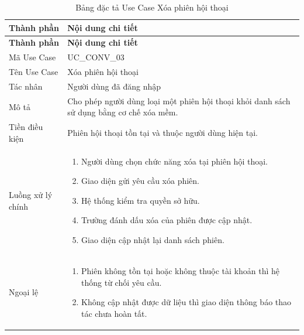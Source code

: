 \documentclass[12pt,a4paper,oneside]{report}
\begin{document}
{
  \begin{longtable}{|L{3.6cm}|L{11.2cm}|}
    \caption{Bảng đặc tả Use Case Xóa phiên hội thoại}\label{tab:uc-conv-delete}                                 \\
    \hline
    \textbf{Thành phần} & \textbf{Nội dung chi tiết}                                                               \\
    \hline
    \endfirsthead
    \hline
    \textbf{Thành phần} & \textbf{Nội dung chi tiết}                                                               \\
    \hline
    \endhead
    Mã Use Case       & UC\_CONV\_03                                                                             \\
    \hline
    Tên Use Case      & Xóa phiên hội thoại                                                                      \\
    \hline
    Tác nhân            & Người dùng đã đăng nhập                                                                  \\
    \hline
    Mô tả               & Cho phép người dùng loại một phiên hội thoại khỏi danh sách sử dụng bằng cơ chế xóa mềm. \\
    \hline
    Tiền điều kiện      & Phiên hội thoại tồn tại và thuộc người dùng hiện tại.                                    \\
    \hline
    Luồng xử lý chính   & \begin{enumerate}[leftmargin=*,nosep]
                            \item Người dùng chọn chức năng xóa tại phiên hội thoại.
                            \item Giao diện gửi yêu cầu xóa phiên.
                            \item Hệ thống kiểm tra quyền sở hữu.
                            \item Trường đánh dấu xóa của phiên được cập nhật.
                            \item Giao diện cập nhật lại danh sách phiên.
                          \end{enumerate}                                  \\
    \hline
    Ngoại lệ            & \begin{enumerate}[leftmargin=*,nosep]
                            \item Phiên không tồn tại hoặc không thuộc tài khoản thì hệ thống từ chối yêu cầu.
                            \item Không cập nhật được dữ liệu thì giao diện thông báo thao tác chưa hoàn tất.

\end{enumerate}
\end{longtable}}
\end{document}
